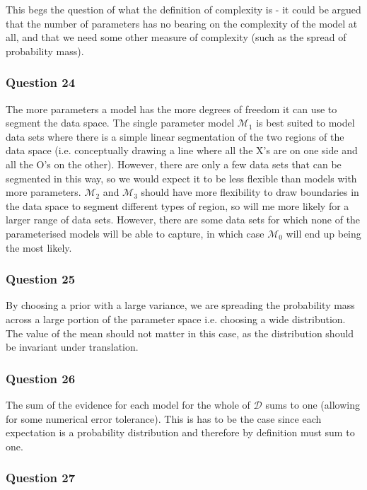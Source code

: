 \documentclass[10pt, a4paper, twocolumn]{article} %
\begin{document}
This begs the question of what the definition of complexity is - it could be argued that the number of parameters has no bearing on the complexity of the model at all, and that we need some other measure of complexity (such as the spread of probability mass).

\subsubsection*{Question 24}

The more parameters a model has the more degrees of freedom it can use to segment the data space. The single parameter model $\mathcal{M}_1$ is best suited to model data sets where there is a simple linear segmentation of the two regions of the data space (i.e. conceptually drawing a line where all the X's are on one side and all the O's on the other). However, there are only a few data sets that can be segmented in this way, so we would expect it to be less flexible than models with more parameters. $\mathcal{M}_2$ and $\mathcal{M_3}$ should have more flexibility to draw boundaries in the data space to segment different types of region, so will me more likely for a larger range of data sets. However, there are some data sets for which none of the parameterised models will be able to capture, in which case $\mathcal{M}_0$ will end up being the most likely.

\subsubsection*{Question 25}

By choosing a prior with a large variance, we are spreading the probability mass across a large portion of the parameter space i.e. choosing a wide distribution. The value of the mean should not matter in this case, as the distribution should be invariant under translation.

\subsubsection*{Question 26}

The sum of the evidence for each model for the whole of $\mathcal{D}$ sums to one (allowing for some numerical error tolerance). This is has to be the case since each expectation is a probability distribution and therefore by definition must sum to one.

\subsubsection*{Question 27}
\end{document}
